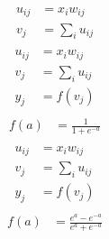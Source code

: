\documentclass{article}[12pt]
\begin{document}
    \begin{align*}
        u_{ij} & = x_i w_{ij} \\
        v_{j} & = \sum_i u_{ij} \\
    \end{align*}
    \begin{align*}
        u_{ij} & = x_i w_{ij} \\
        v_{j} & = \sum_i u_{ij} \\
        y_{j} & = f(v_{j}) \\
    \end{align*}
    \begin{align*}
        f(a) & = \frac{1}{1 + e^{-a}} \\ 
    \end{align*}
    \begin{align*}
        u_{ij} & = x_i w_{ij} \\
        v_{j} & = \sum_i u_{ij} \\
        y_{j} & = f(v_{j}) \\
    \end{align*}
    \begin{align*}
        f(a) & = \frac{e^{a} - e^{-a}}{e^{a} + e^{-a}} \\ 
    \end{align*}
\end{document}
